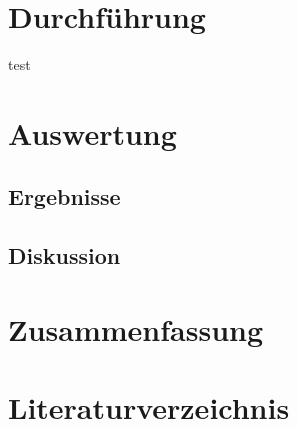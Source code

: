 \documentclass[12pt, a4paper]{article}
\begin{document}
\newpage
\section{Durchführung}

test




\newpage
\section{Auswertung}
\subsection{Ergebnisse}
\subsection{Diskussion}



\newpage
\section{Zusammenfassung}





\newpage
\section{Literaturverzeichnis}
\end{document}
